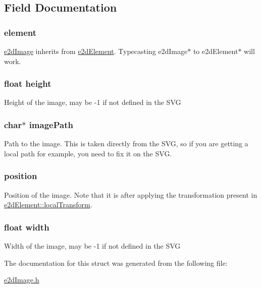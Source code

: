 \subsection{Field Documentation}
\hypertarget{structe2dImage_a55bc7a3a0af41fba9e5b91f390c5928c}{
\subsubsection[{element}]{ {\bf element}}}\label{structe2dImage_a55bc7a3a0af41fba9e5b91f390c5928c}
\hyperlink{structe2dImage}{e2d\-Image} inherits from \hyperlink{structe2dElement}{e2d\-Element}. Typecasting e2d\-Image$\ast$ to e2d\-Element$\ast$ will work. \hypertarget{structe2dImage_a48083b65ac9a863566dc3e3fff09a5b4}{
\subsubsection[{height}]{\setlength{\rightskip}{0pt plus 5cm}float {\bf height}}}\label{structe2dImage_a48083b65ac9a863566dc3e3fff09a5b4}
Height of the image, may be -\/1 if not defined in the S\-V\-G \hypertarget{structe2dImage_afb14ab23ba86115c3b01ad4122943f89}{
\subsubsection[{image\-Path}]{\setlength{\rightskip}{0pt plus 5cm}char$\ast$ {\bf image\-Path}}}\label{structe2dImage_afb14ab23ba86115c3b01ad4122943f89}
Path to the image. This is taken directly from the S\-V\-G, so if you are getting a local path for example, you need to fix it on the S\-V\-G. \hypertarget{structe2dImage_afa8983f25fd6aa6aca18feb07d8d2249}{
\subsubsection[{position}]{ {\bf position}}}\label{structe2dImage_afa8983f25fd6aa6aca18feb07d8d2249}
Position of the image. Note that it is after applying the transformation present in \hyperlink{structe2dElement_a52bda732df714953f93c1e6f5f7c7c93}{e2d\-Element\-::local\-Transform}. \hypertarget{structe2dImage_ae426f00e82704fa09578f5446e22d915}{
\subsubsection[{width}]{\setlength{\rightskip}{0pt plus 5cm}float {\bf width}}}\label{structe2dImage_ae426f00e82704fa09578f5446e22d915}
Width of the image, may be -\/1 if not defined in the S\-V\-G 

The documentation for this struct was generated from the following file\-:\begin{DoxyCompactItemize}
\item 
\hyperlink{e2dImage_8h}{e2d\-Image.\-h}\end{DoxyCompactItemize}
